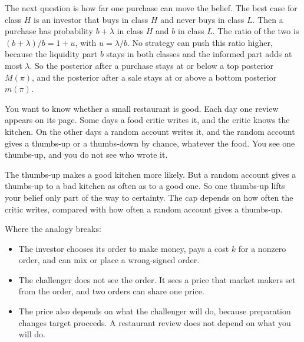 The next question is how far one purchase can move the belief. The best case for class \(H\) is an investor that buys in class \(H\) and never buys in class \(L\). Then a purchase has probability \(b+\lambda\) in class \(H\) and \(b\) in class \(L\). The ratio of the two is \((b+\lambda)/b=1+u\), with \(u=\lambda/b\). No strategy can push this ratio higher, because the liquidity part \(b\) stays in both classes and the informed part adds at most \(\lambda\). So the posterior after a purchase stays at or below a top posterior \(M(\pi)\), and the posterior after a sale stays at or above a bottom posterior \(m(\pi)\).

\begin{analogy}
You want to know whether a small restaurant is good. Each day one review appears on its page. Some days a food critic writes it, and the critic knows the kitchen. On the other days a random account writes it, and the random account gives a thumbs-up or a thumbs-down by chance, whatever the food. You see one thumbs-up, and you do not see who wrote it.

The thumbs-up makes a good kitchen more likely. But a random account gives a thumbs-up to a bad kitchen as often as to a good one. So one thumbs-up lifts your belief only part of the way to certainty. The cap depends on how often the critic writes, compared with how often a random account gives a thumbs-up.

Where the analogy breaks:
\begin{itemize}
\item The investor chooses its order to make money, pays a cost \(k\) for a nonzero order, and can mix or place a wrong-signed order.
\item The challenger does not see the order. It sees a price that market makers set from the order, and two orders can share one price.
\item The price also depends on what the challenger will do, because preparation changes target proceeds. A restaurant review does not depend on what you will do.
\end{itemize}
\end{analogy}

